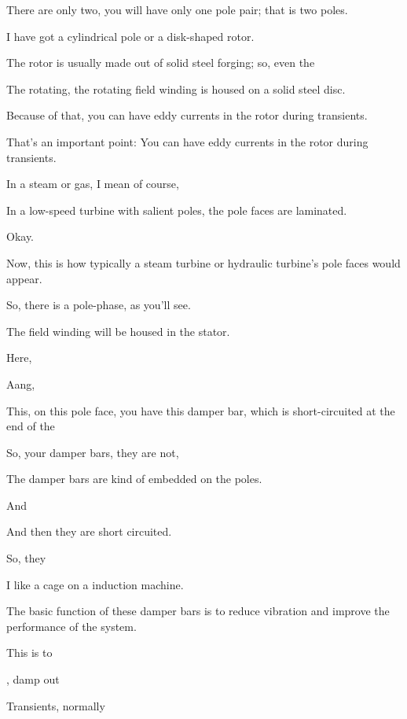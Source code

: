 \documentclass{article}
\begin{document}
There are only two, you will have only one pole pair; that is two poles.

I have got a cylindrical pole or a disk-shaped rotor.

The rotor is usually made out of solid steel forging; so, even the

The rotating, the rotating field winding is housed on a solid steel disc.

Because of that, you can have eddy currents in the rotor during transients.

That's an important point: You can have eddy currents in the rotor during transients.

In a steam or gas, I mean of course,

In a low-speed turbine with salient poles, the pole faces are laminated.

Okay.

Now, this is how typically a steam turbine or hydraulic turbine's pole faces would appear.

So, there is a pole-phase, as you'll see.

The field winding will be housed in the stator.

Here,

Aang,

This, on this pole face, you have this damper bar, which is short-circuited at the end of the

So, your damper bars, they are not,

The damper bars are kind of embedded on the poles.

And

And then they are short circuited.

So, they

I like a cage on a induction machine.

The basic function of these damper bars is to reduce vibration and improve the performance of the system.

This is to

, damp out

Transients, normally
\end{document}
